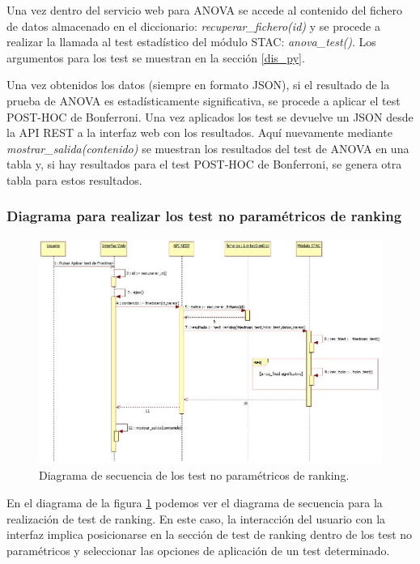 Una vez dentro del servicio web para ANOVA se accede al contenido del fichero de datos almacenado en el diccionario: \textit{recuperar\_fichero(id)} y se procede a realizar la llamada al test estadístico del módulo STAC: \textit{anova\_test()}. Los argumentos para los test se muestran en la sección \ref{dis_py}.

Una vez obtenidos los datos (siempre en formato JSON), si el resultado de la prueba de ANOVA es estadísticamente significativa, se procede a aplicar el test POST-HOC de Bonferroni. Una vez aplicados los test se devuelve un JSON desde la API REST a la interfaz web con los resultados. Aquí nuevamente mediante \textit{mostrar\_salida(contenido)} se muestran los resultados del test de ANOVA en una tabla y, si hay resultados para el test POST-HOC de Bonferroni, se genera otra tabla para estos resultados.

\subsubsection{Diagrama para realizar los test no paramétricos de ranking}

\begin{figure}[H]
\centering
\begin{adjustwidth}{-4em}{-4em}
\includegraphics[scale=0.7]{figuras/sec_ranking.jpg}
\caption{Diagrama de secuencia de los test no paramétricos de ranking.}
\label{fig:sec_ranking}
\end{adjustwidth}
\end{figure}

En el diagrama de la figura \ref*{fig:sec_ranking} podemos ver el diagrama de secuencia para la realización de test de ranking. En este caso, la interacción del usuario con la interfaz implica posicionarse en la sección de test de ranking dentro de los test no paramétricos y seleccionar las opciones de aplicación de un test determinado.

